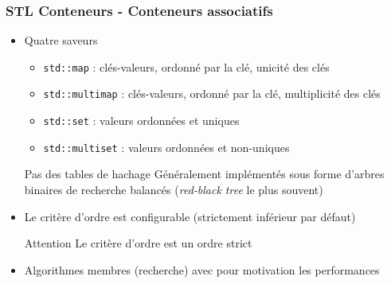 \documentclass[C++.tex]{subfiles}
\begin{document}
\begin{frame}
	\frametitle{STL Conteneurs - Conteneurs associatifs}
	\begin{itemize}
		\item Quatre saveurs
		\begin{itemize}
			\item \lstinline|std::map| : clés-valeurs, ordonné par la clé, unicité des clés
			\item \lstinline|std::multimap| : clés-valeurs, ordonné par la clé, multiplicité des clés
			\item \lstinline|std::set| : valeurs ordonnées et uniques
			\item \lstinline|std::multiset| : valeurs ordonnées et non-uniques
		\end{itemize}

		\begin{alertblock}{Pas des tables de hachage}
			Généralement implémentés sous forme d'arbres binaires de recherche balancés (\textit{red-black tree} le plus souvent)
		\end{alertblock}

		\item Le critère d'ordre est configurable (strictement inférieur par défaut)

		\begin{alertblock}{Attention}
			Le critère d'ordre est un ordre strict
		\end{alertblock}

		\item Algorithmes membres (recherche) avec pour motivation les performances
	\end{itemize}
\end{frame}
\end{document}
